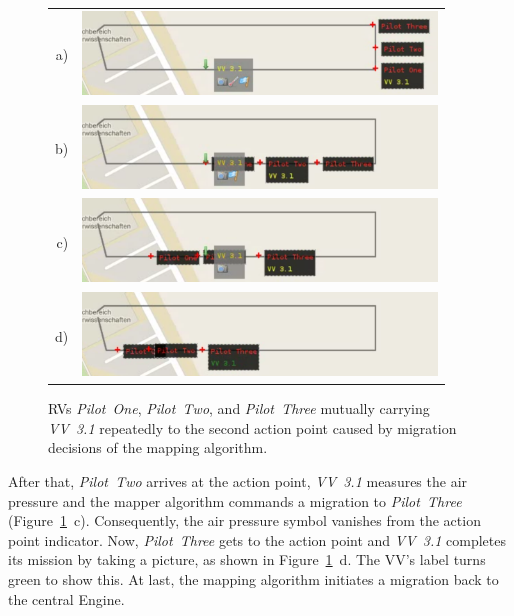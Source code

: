 \begin{figure}[h]
	\begin{center}
		\begin{tabular}{rr}
			a)&{\includegraphics[width=9.4cm]{ese-demo3-5.png}} \\
			b)&{\includegraphics[width=9.4cm]{ese-demo3-6.png}} \\
			c)&{\includegraphics[width=9.4cm]{ese-demo3-7.png}} \\
			d)&{\includegraphics[width=9.4cm]{ese-demo3-8.png}}
		\end{tabular}
	\end{center}
	\caption{\acp{RV} \textit{Pilot~One}, \textit{Pilot~Two}, and \textit{Pilot~Three} mutually carrying
		\textit{VV~3.1} repeatedly to the second action point caused by migration decisions of the mapping
		algorithm.\label{fig:demo3mig04}}
\end{figure}
After that, \textit{Pilot~Two}
arrives at the action point, \textit{VV~3.1} measures the air pressure and the mapper algorithm commands
a migration to \textit{Pilot~Three} (Figure~\ref{fig:demo3mig04}~c).
Consequently, the air pressure symbol vanishes from the action point indicator.
%
Now, \textit{Pilot~Three} gets to the action point and \textit{VV~3.1} completes its mission by 
taking a picture, as shown in Figure~\ref{fig:demo3mig04}~d. The \ac{VV}'s label turns green to show this.
%
At last, the mapping algorithm initiates a migration back to the central Engine.


